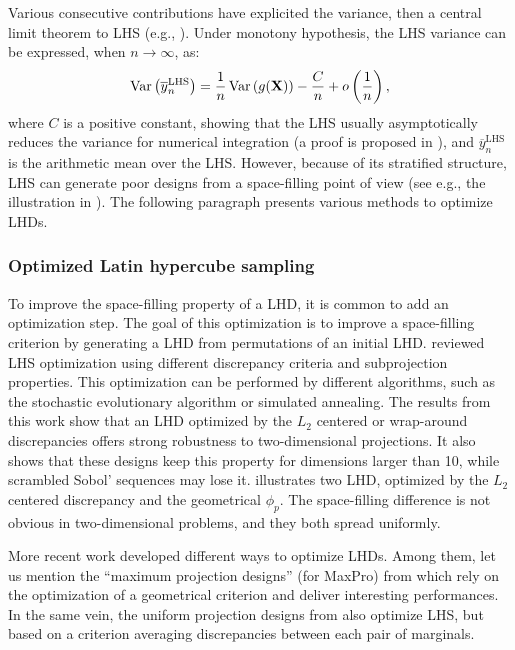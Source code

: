 Various consecutive contributions have explicited the variance, then a central limit theorem to LHS (e.g., \citealp{owen_1992_tcl_lhs}). 
Under monotony hypothesis, the LHS variance can be expressed, when $n\rightarrow\infty$, as:
\begin{equation}
    \operatorname{Var}\left(\overline{y}_n^{\textrm{LHS}}\right) = \frac{1}{n} \operatorname{Var}\left(g({\bf X})\right) - \frac{C}{n} + o\left( \frac1n \right), 
\end{equation}
where $C$ is a positive constant, showing that the LHS usually asymptotically reduces the variance for numerical integration (a proof is proposed in \citealp{stein_1987_lhs}), and $\overline{y}_n^{\textrm{LHS}}$ is the arithmetic mean over the LHS. 
However, because of its stratified structure, LHS can generate poor designs from a space-filling point of view (see e.g., the illustration in ). 
The following paragraph presents various methods to optimize LHDs.


\subsubsection{Optimized Latin hypercube sampling}
To improve the space-filling property of a LHD, it is common to add an optimization step. 
The goal of this optimization is to improve a space-filling criterion by generating a LHD from permutations of an initial LHD. 
\citet{damblin_couplet_2013} reviewed LHS optimization using different discrepancy criteria and subprojection properties. 
This optimization can be performed by different algorithms, such as the stochastic evolutionary algorithm or simulated annealing. 
The results from this work show that an LHD optimized by the $L_2$ centered or wrap-around discrepancies offers strong robustness to two-dimensional projections. 
It also shows that these designs keep this property for dimensions larger than 10, while scrambled Sobol' sequences may lose it. 
 illustrates two LHD, optimized by the $L_2$ centered discrepancy and the geometrical $\phi_p$. 
The space-filling difference is not obvious in two-dimensional problems, and they both spread uniformly.    

More recent work developed different ways to optimize LHDs. 
Among them, let us mention the ``maximum projection designs'' (for MaxPro) from \citet{joseph_gul_2015} which rely on the optimization of a geometrical criterion and deliver interesting performances. 
In the same vein, the uniform projection designs from \citet{sun_2019} also optimize LHS, but based on a criterion averaging discrepancies between each pair of marginals.

